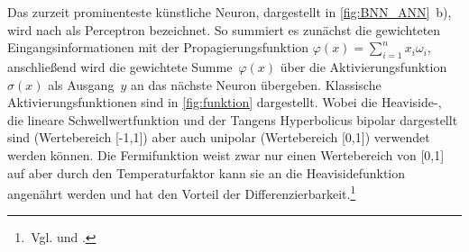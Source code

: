 Das zurzeit prominenteste künstliche Neuron, dargestellt in \hbox{\autoref{fig:BNN_ANN} b)}, wird nach \citet{perceptron_ros58} als Perceptron bezeichnet. %
So summiert es zunächst die gewichteten Eingangsinformationen mit der Propagierungsfunktion $\varphi (x)=\sum_{i=1}^{n}x_{i}\omega_{i}$, anschließend wird die gewichtete Summe~$\varphi(x)$ über die Aktivierungsfunktion~$\sigma(x)$ als Ausgang~$y$ an das nächste Neuron übergeben.
%
%
%
Klassische Aktivierungsfunktionen sind in \autoref{fig:funktion} dargestellt. Wobei die \hbox{Heaviside-,} die lineare Schwellwertfunktion und der Tangens Hyperbolicus bipolar dargestellt sind (Wertebereich [-1,1]) aber auch unipolar (Wertebereich [0,1]) verwendet werden können. Die Fermifunktion weist zwar nur einen Wertebereich von [0,1] auf aber durch den Temperaturfaktor kann sie an die Heavisidefunktion angenährt werden und hat den Vorteil der Differenzierbarkeit.\footnote{\,Vgl. \citet[5]{neuralnet_intro} und \citet[39 f]{dkriesel07}.}


